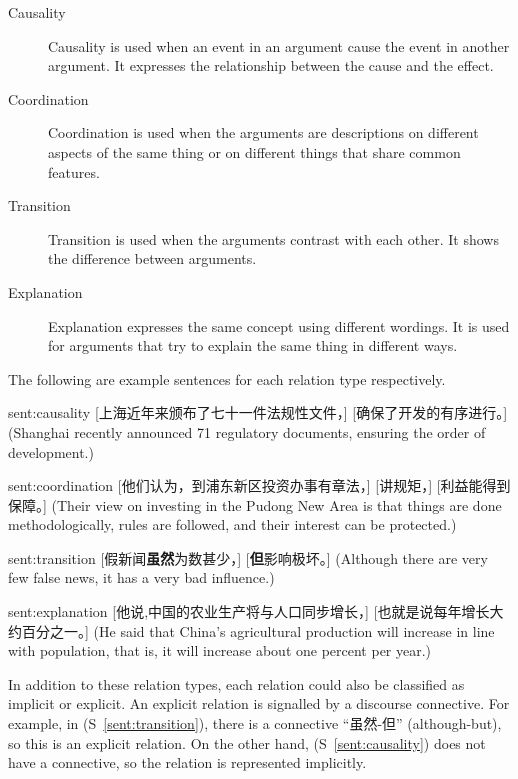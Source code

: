 \begin{description}
\item[Causality] Causality is used when an event in an argument cause the event
    in another argument. It expresses the relationship between the cause
    and the effect.
\item[Coordination] Coordination is used when the arguments are
    descriptions on different aspects of the same thing or
    on different things that share common features.
\item[Transition] Transition is used when the arguments contrast with each other.
    It shows the difference between arguments.
\item[Explanation] Explanation expresses the same concept using different wordings.
    It is used for arguments that try to explain the same thing in different
    ways.
\end{description}

The following are example sentences for each relation type respectively.

\begin{sent}{sent:causality}{}
    [上海近年来颁布了七十一件法规性文件，] [确保了开发的有序进行。]
    (Shanghai recently announced 71 regulatory documents, ensuring
    the order of development.)
\end{sent}

\begin{sent}{sent:coordination}{}
    [他们认为，到浦东新区投资办事有章法，] [讲规矩，] [利益能得到保障。]
    (Their view on investing in the Pudong New Area is that
    things are done methodologically,
    rules are followed, and their interest can be protected.)
\end{sent}

\begin{sent}{sent:transition}{}
    [假新闻\textbf{虽然}为数甚少，] [\textbf{但}影响极坏。]
    (Although there are very few false news, it has a very bad influence.)
\end{sent}

\begin{sent}{sent:explanation}{}
    [他说,中国的农业生产将与人口同步增长，] [也就是说每年增长大约百分之一。]
    (He said that China's agricultural production will increase in line with
    population, that is, it will increase about one percent per year.)
\end{sent}

In addition to these relation types, each relation could also be classified
as implicit or explicit. An explicit relation is signalled by a discourse connective.
For example, in (S~\ref{sent:transition}), there is a connective ``虽然-但''
(although-but), so this is an explicit relation. On the other hand,
(S~\ref{sent:causality}) does not have a connective, so the relation
is represented implicitly.

